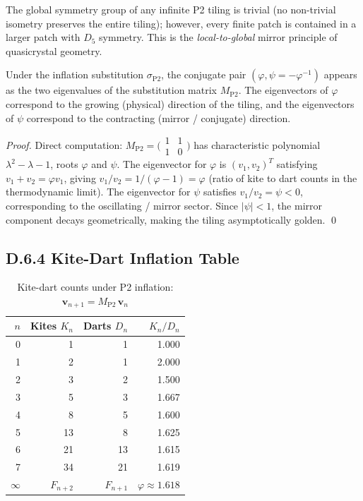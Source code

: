 The global symmetry group of any infinite P2 tiling is trivial (no non-trivial
isometry preserves the entire tiling); however, every finite patch is contained
in a larger patch with $D_5$ symmetry.  This is the \emph{local-to-global}
mirror principle of quasicrystal geometry.

\begin{lemma}
\label{lem:D:4}
Under the inflation substitution $\sigma_{\mathrm{P2}}$, the conjugate pair
$(\varphi, \psi = -\varphi^{-1})$ appears as the two eigenvalues of the
substitution matrix $M_{\mathrm{P2}}$.  The eigenvectors of $\varphi$ correspond
to the growing (physical) direction of the tiling, and the eigenvectors of $\psi$
correspond to the contracting (mirror / conjugate) direction.
\end{lemma}

\begin{proof}
Direct computation: $M_{\mathrm{P2}} = \bigl(\begin{smallmatrix}1&1\\1&0\end{smallmatrix}\bigr)$
has characteristic polynomial $\lambda^2 - \lambda - 1$, roots $\varphi$ and $\psi$.
The eigenvector for $\varphi$ is $(v_1, v_2)^T$ satisfying
$v_1 + v_2 = \varphi v_1$, giving $v_1/v_2 = 1/(\varphi-1) = \varphi$
(ratio of kite to dart counts in the thermodynamic limit).
The eigenvector for $\psi$ satisfies $v_1/v_2 = \psi < 0$, corresponding
to the oscillating / mirror sector.  Since $|\psi| < 1$, the mirror component
decays geometrically, making the tiling asymptotically golden. \qed
\end{proof}

\subsection*{D.6.4  Kite-Dart Inflation Table}

\begin{table}[h]
\centering
\caption{Kite-dart counts under P2 inflation: $\mathbf{v}_{n+1} = M_{\mathrm{P2}}\,\mathbf{v}_n$}
\begin{tabular}{rrrr}
\toprule
$n$ & Kites $K_n$ & Darts $D_n$ & $K_n/D_n$ \\
\midrule
0 & 1 & 1 & 1.000 \\
1 & 2 & 1 & 2.000 \\
2 & 3 & 2 & 1.500 \\
3 & 5 & 3 & 1.667 \\
4 & 8 & 5 & 1.600 \\
5 & 13 & 8 & 1.625 \\
6 & 21 & 13 & 1.615 \\
7 & 34 & 21 & 1.619 \\
$\infty$ & $F_{n+2}$ & $F_{n+1}$ & $\varphi\approx 1.618$ \\
\bottomrule
\end{tabular}
\end{table}

